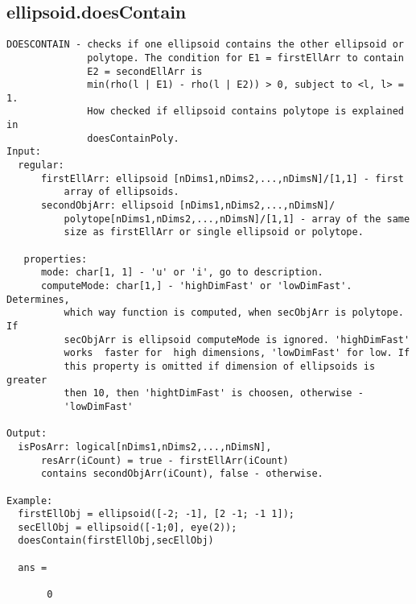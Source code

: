 \subsection{\texorpdfstring{ellipsoid.doesContain}{doesContain}}\label{method:ellipsoid.doesContain}
\begin{verbatim}
DOESCONTAIN - checks if one ellipsoid contains the other ellipsoid or
              polytope. The condition for E1 = firstEllArr to contain
              E2 = secondEllArr is
              min(rho(l | E1) - rho(l | E2)) > 0, subject to <l, l> = 1.
              How checked if ellipsoid contains polytope is explained in
              doesContainPoly.
Input:
  regular:
      firstEllArr: ellipsoid [nDims1,nDims2,...,nDimsN]/[1,1] - first
          array of ellipsoids.
      secondObjArr: ellipsoid [nDims1,nDims2,...,nDimsN]/
          polytope[nDims1,nDims2,...,nDimsN]/[1,1] - array of the same
          size as firstEllArr or single ellipsoid or polytope.

   properties:
      mode: char[1, 1] - 'u' or 'i', go to description.
      computeMode: char[1,] - 'highDimFast' or 'lowDimFast'. Determines,
          which way function is computed, when secObjArr is polytope. If
          secObjArr is ellipsoid computeMode is ignored. 'highDimFast'
          works  faster for  high dimensions, 'lowDimFast' for low. If
          this property is omitted if dimension of ellipsoids is greater
          then 10, then 'hightDimFast' is choosen, otherwise -
          'lowDimFast'

Output:
  isPosArr: logical[nDims1,nDims2,...,nDimsN],
      resArr(iCount) = true - firstEllArr(iCount)
      contains secondObjArr(iCount), false - otherwise.

Example:
  firstEllObj = ellipsoid([-2; -1], [2 -1; -1 1]);
  secEllObj = ellipsoid([-1;0], eye(2));
  doesContain(firstEllObj,secEllObj)

  ans =

       0
\end{verbatim}
